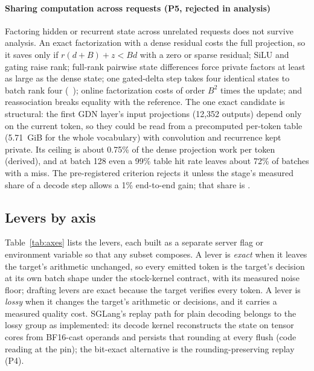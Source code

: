 \paragraph{Sharing computation across requests (P5, rejected in analysis)} Factoring hidden or recurrent state across unrelated requests does not survive analysis. An exact factorization with a dense residual costs the full projection, so it saves only if $r(d+B)+z<Bd$ with a zero or sparse residual; SiLU and gating raise rank; full-rank pairwise state differences force private factors at least as large as the dense state; one gated-delta step takes four identical states to batch rank four (~); online factorization costs of order $B^2$ times the update; and reassociation breaks equality with the reference. The one exact candidate is structural: the first GDN layer's input projections (12,352 outputs) depend only on the current token, so they could be read from a precomputed per-token table (5.71~GiB for the whole vocabulary) with convolution and recurrence kept private. Its ceiling is about 0.75\% of the dense projection work per token (derived), and at batch 128 even a 99\% table hit rate leaves about 72\% of batches with a miss. The pre-registered criterion rejects it unless the stage's measured share of a decode step allows a 1\% end-to-end gain; that share is .

\subsection{Levers by axis}\label{sec:stack-levers}
Table~\ref{tab:axes} lists the levers, each built as a separate server flag or environment variable so that any subset composes. A lever is \emph{exact} when it leaves the target's arithmetic unchanged, so every emitted token is the target's decision at its own batch shape under the stock-kernel contract, with its measured noise floor; drafting levers are exact because the target verifies every token. A lever is \emph{lossy} when it changes the target's arithmetic or decisions, and it carries a measured quality cost. SGLang's replay path for plain decoding belongs to the lossy group as implemented: its decode kernel reconstructs the state on tensor cores from BF16-cast operands and persists that rounding at every flush (code reading at the pin); the bit-exact alternative is the rounding-preserving replay (P4).

